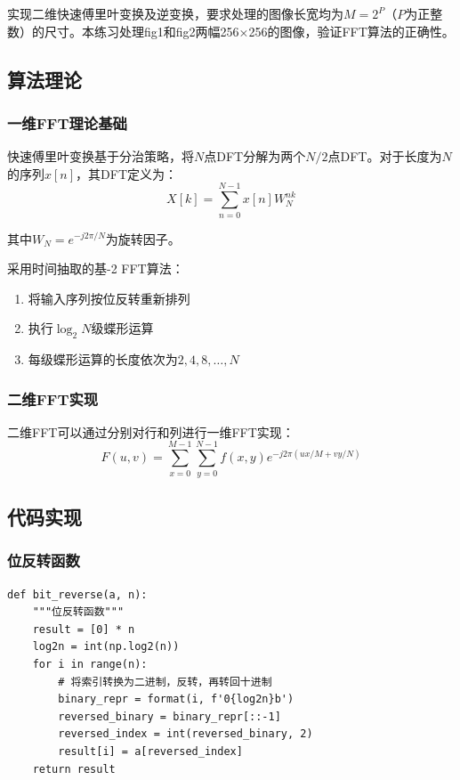 \documentclass[a4paper]{article}
\begin{document}
实现二维快速傅里叶变换及逆变换，要求处理的图像长宽均为$M=2^P$（$P$为正整数）的尺寸。本练习处理fig1和fig2两幅256×256的图像，验证FFT算法的正确性。

\subsection{算法理论}

\subsubsection{一维FFT理论基础}

快速傅里叶变换基于分治策略，将$N$点DFT分解为两个$N/2$点DFT。对于长度为$N$的序列$x[n]$，其DFT定义为：
$$X[k] = \sum_{n=0}^{N-1} x[n] W_N^{nk}$$

其中$W_N = e^{-j2\pi/N}$为旋转因子。

采用时间抽取的基-2 FFT算法：
\begin{enumerate}
    \item 将输入序列按位反转重新排列
    \item 执行$\log_2 N$级蝶形运算
    \item 每级蝶形运算的长度依次为$2, 4, 8, \ldots, N$
\end{enumerate}

\subsubsection{二维FFT实现}

二维FFT可以通过分别对行和列进行一维FFT实现：
$$F(u,v) = \sum_{x=0}^{M-1} \sum_{y=0}^{N-1} f(x,y) e^{-j2\pi(ux/M + vy/N)}$$

\subsection{代码实现}

\subsubsection{位反转函数}

\begin{lstlisting}
def bit_reverse(a, n):
    """位反转函数"""
    result = [0] * n
    log2n = int(np.log2(n))
    for i in range(n):
        # 将索引转换为二进制，反转，再转回十进制
        binary_repr = format(i, f'0{log2n}b')
        reversed_binary = binary_repr[::-1]
        reversed_index = int(reversed_binary, 2)
        result[i] = a[reversed_index]
    return result
\end{lstlisting}
\end{document}

